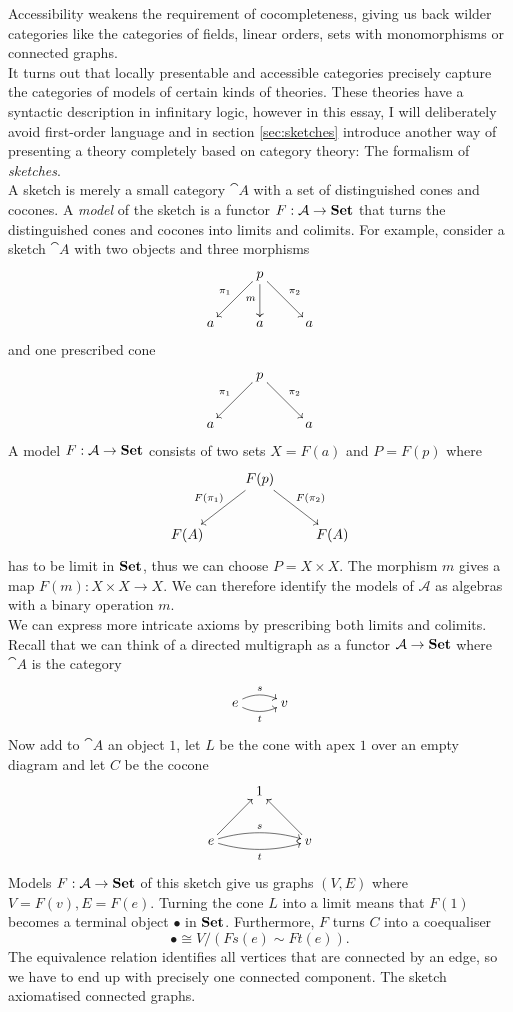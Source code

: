 Accessibility weakens the requirement of cocompleteness, giving us back wilder categories like the categories of fields, linear orders, sets with monomorphisms or connected graphs. \\

It turns out that locally presentable and accessible categories precisely capture the categories of models of certain kinds of theories. These theories have a syntactic description in infinitary logic, however in this essay, I will deliberately avoid first-order language and in section \ref{sec:sketches} introduce another way of presenting a theory completely based on category theory: The formalism of \emph{sketches}. \\

A sketch is merely a small category $\cat A$ with a set of distinguished cones and cocones. A \emph{model} of the sketch is a functor $F : \mathcal{A} \to \mathbf{Set}$ that turns the distinguished cones and cocones into limits and colimits. For example, consider a sketch $\cat A$ with two objects and three morphisms
\[
\xymatrix{
  & p \ar[rd]^{\pi_2} \ar[d]_{m} \ar[ld]_{\pi_1} & \\
a & a & a
}\]
and one prescribed cone
\[
\xymatrix{
  & p \ar[rd]^{\pi_2} \ar[ld]_{\pi_1} & \\
a & & a
}\]
A model $F : \mathcal{A} \to \mathbf{Set}$ consists of two sets $X=F(a)$ and $P=F(p)$ where
\[
\xymatrix{
  & F(p) \ar[rd]^{F(\pi_2)} \ar[ld]_{F(\pi_1)} & \\
F(A) & & F(A)
}\]
has to be limit in $\mathbf{Set}$, thus we can choose $P = X \times X$. The morphism $m$ gives a map $F(m) : X \times X \to X$. We can therefore identify the models of $\mathcal A$ as algebras with a binary operation $m$. \\

We can express more intricate axioms by prescribing both limits and colimits. Recall that we can think of a directed multigraph as a functor $\mathcal{A} \to \mathbf{Set}$ where $\cat A$ is the category
\[
\xymatrix{
e \ar@/^/[r]^{s} \ar@/_/[r]_{t} & v
}\]
Now add to $\cat A$ an object $1$, let $L$ be the cone with apex $1$ over an empty diagram and let $C$ be the cocone \[
\xymatrix{
& 1 \\
e \ar@/^/[rr]^{s} \ar@/_/[rr]_{t} \ar[ru] & & v \ar[lu] \\
}\]
Models $F: \mathcal{A} \to \mathbf{Set}$ of this sketch give us graphs $(V,E)$ where $V=F(v),E=F(e)$. Turning the cone $L$ into a limit means that $F(1)$ becomes a terminal object $\bullet$ in $\mathbf{Set}$. Furthermore, $F$ turns $C$ into a coequaliser
\[ \bullet \cong V/(Fs(e)\sim Ft(e)). \]
The equivalence relation identifies all vertices that are connected by an edge, so we have to end up with precisely one connected component. The sketch axiomatised connected graphs. \\

